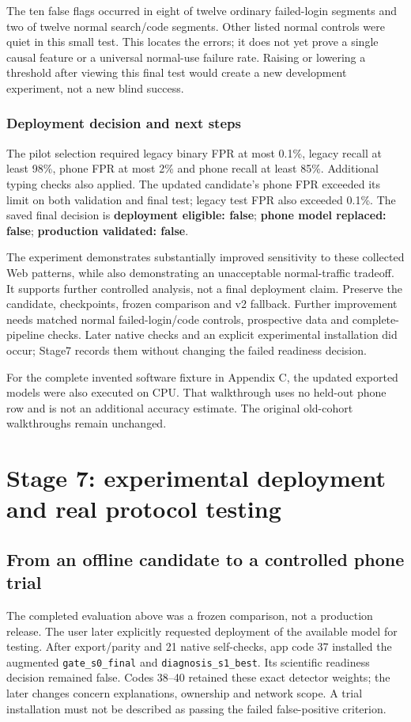 \documentclass[11pt,a4paper,oneside]{report}
\newcommand{\code}[1]{\nolinkurl{#1}}
\begin{document}
The ten false flags occurred in eight of twelve ordinary failed-login segments and two of twelve normal search/code segments. Other listed normal controls were quiet in this small test. This locates the errors; it does not yet prove a single causal feature or a universal normal-use failure rate. Raising or lowering a threshold after viewing this final test would create a new development experiment, not a new blind success.

\subsection{Deployment decision and next steps}
The pilot selection required legacy binary FPR at most 0.1\%, legacy recall at least 98\%, phone FPR at most 2\% and phone recall at least 85\%. Additional typing checks also applied. The updated candidate's phone FPR exceeded its limit on both validation and final test; legacy test FPR also exceeded 0.1\%. The saved final decision is \textbf{deployment eligible: false}; \textbf{phone model replaced: false}; \textbf{production validated: false}.

The experiment demonstrates substantially improved sensitivity to these collected Web patterns, while also demonstrating an unacceptable normal-traffic tradeoff. It supports further controlled analysis, not a final deployment claim. Preserve the candidate, checkpoints, frozen comparison and v2 fallback. Further improvement needs matched normal failed-login/code controls, prospective data and complete-pipeline checks. Later native checks and an explicit experimental installation did occur; Stage7 records them without changing the failed readiness decision.

For the complete invented software fixture in Appendix C, the updated exported models were also executed on CPU. That walkthrough uses no held-out phone row and is not an additional accuracy estimate. The original old-cohort walkthroughs remain unchanged.


\chapter{Stage 7: experimental deployment and real protocol testing}
\section{From an offline candidate to a controlled phone trial}
The completed evaluation above was a frozen comparison, not a production release. The user later explicitly requested deployment of the available model for testing. After export/parity and 21 native self-checks, app code 37 installed the augmented \code{gate_s0_final} and \code{diagnosis_s1_best}. Its scientific readiness decision remained false. Codes 38--40 retained these exact detector weights; the later changes concern explanations, ownership and network scope. A trial installation must not be described as passing the failed false-positive criterion.
\end{document}
